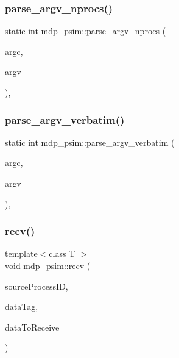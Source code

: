 \subsubsection{\texorpdfstring{parse\+\_\+argv\+\_\+nprocs()}{parse\_argv\_nprocs()}}
{\footnotesize\ttfamily static int mdp\+\_\+psim\+::parse\+\_\+argv\+\_\+nprocs (\begin{DoxyParamCaption}\item[{int}]{argc,  }\item[{char $\ast$$\ast$}]{argv }\end{DoxyParamCaption})\hspace{0.3cm}{\ttfamily [inline]}, {\ttfamily [static]}}

\mbox{\label{classmdp__psim_acb1e64aadc39fa7deeb4e87b36f7cd3c}} 
\subsubsection{\texorpdfstring{parse\+\_\+argv\+\_\+verbatim()}{parse\_argv\_verbatim()}}
{\footnotesize\ttfamily static int mdp\+\_\+psim\+::parse\+\_\+argv\+\_\+verbatim (\begin{DoxyParamCaption}\item[{int}]{argc,  }\item[{char $\ast$$\ast$}]{argv }\end{DoxyParamCaption})\hspace{0.3cm}{\ttfamily [inline]}, {\ttfamily [static]}}

\mbox{\label{classmdp__psim_a63631ebb9f80dac0d9c80c9f57a36672}} 
\subsubsection{\texorpdfstring{recv()}{recv()}\hspace{0.1cm}{\footnotesize\ttfamily [1/2]}}
{\footnotesize\ttfamily template$<$class T $>$ \\
void mdp\+\_\+psim\+::recv (\begin{DoxyParamCaption}\item[{int}]{source\+Process\+ID,  }\item[{string}]{data\+Tag,  }\item[{T \&}]{data\+To\+Receive }\end{DoxyParamCaption})\hspace{0.3cm}{\ttfamily [inline]}}

